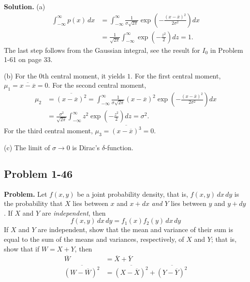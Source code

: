 \documentclass[twocolumn, 10pt]{article}
\numberwithin{equation}{section}
\newenvironment{problem}
{\par\medskip\sffamily \color{problue}
  \textbf{Problem. }\ignorespaces}
{\medskip}
\newenvironment{solution}
{\par\medskip
  \textbf{Solution. }\ignorespaces}
{\medskip}
\begin{document}
\begin{solution}
  (a)
  \begin{align*}
  \int_{-\infty}^\infty p(x) \, dx
  &=
  \int_{-\infty}^\infty
  \frac{1}{\sigma \sqrt{2\pi}}
  \exp\left( -\frac{ (x -\bar x)^2 } { 2 \sigma^2} \right) dx
  \\
  &=
  \frac{1}{\sqrt{2\pi}}
  \int_{-\infty}^\infty
  \exp\left( -\frac{ z^2 } { 2} \right) dz
  =
  1.
  \end{align*}
  The last step follows from the Gaussian integral,
  see the result for $I_0$ in Problem 1-61 on page 33.

  (b)
  For the $0$th central moment, it yields $1$.
  For the first central moment,
  $\mu_1 = \overline{ x - \overline x} = 0$.
  For the second central moment,
  \begin{align*}
  \mu_2
  &= \overline{ (x - \overline x)^2 }
  =
  \int_{-\infty}^\infty
  \frac{1}{\sigma \sqrt{2\pi}}
    (x- \overline x)^2 \exp\left( -\frac{ (x -\bar x)^2 } { 2 \sigma^2} \right) dx
  \\
  &=
  \frac{\sigma^2}{ \sqrt{2\pi}}
  \int_{-\infty}^\infty
    z^2 \exp\left( -\frac{ z^2 } {2} \right) dz
  =
  \sigma^2.
  \end{align*}
  For the third central moment,
  $\mu_3 = \overline{ (x - \overline x)^3 } = 0$.

  (c) The limit of $\sigma \to 0$ is Dirac's $\delta$-function.
\end{solution}

\subsection{Problem 1-46}

\begin{problem}
  Let $f(x, y)$ be a joint probability density,
  that is, $f(x, y)\, dx \, dy$
  is the probability that $X$ lies between $x$ and $x+dx$
  \emph{and}
  $Y$ lies between $y$ and $y + dy$.
  If $X$ and $Y$ are \emph{independent}, then
  $$
  f(x, y) \, dx \, dy = f_1(x) f_2(y) \, dx \, dy
  $$
  If $X$ and $Y$ are independent, show that the mean and variance
  of their sum is equal to the sum of the means and variances, respectively,
  of $X$ and $Y$;
  that is, show that if $W = X + Y$, then
  \begin{align*}
    \overline W &= \overline X + \overline Y \\
    \overline{ (W - \overline W)^2 } &=
    \overline{ (X - \overline X)^2 } +
    \overline{ (Y - \overline Y)^2 }
  \end{align*}
\end{problem}
\end{document}
